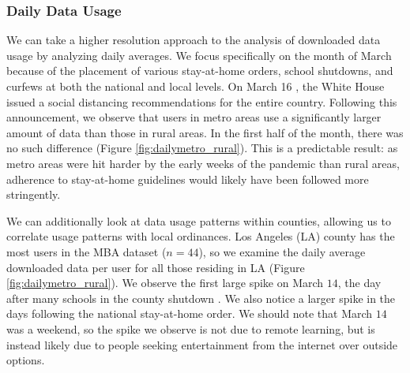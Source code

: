 \subsubsection{Daily Data Usage}
We can take a higher resolution approach to the analysis of downloaded data usage by analyzing daily averages. We focus specifically on the month of March because of the placement of various stay-at-home orders, school shutdowns, and curfews at both the national and local levels. On March 16 \cite{trump2020coronavirus}, the White House issued a social distancing recommendations for the entire country. Following this announcement, we observe that users in metro areas use a significantly larger amount of data than those in rural areas. In the first half of the month, there was no such difference (Figure \ref{fig:dailymetro_rural}). This is a predictable result: as metro areas were hit harder by the early weeks of the pandemic than rural areas, adherence to stay-at-home guidelines would likely have been followed more stringently. 

We can additionally look at data usage patterns within counties, allowing us to correlate usage patterns with local ordinances. Los Angeles (LA) county has the most users in the MBA dataset ($n=44$), so we examine the daily average downloaded data per user for all those residing in LA (Figure \ref{fig:dailymetro_rural}). We observe the first large spike on March $14$, the day after many schools in the county shutdown \cite{haire2020LA}. We also notice a larger spike in the days following the national stay-at-home order. We should note that March $14$ was a weekend, so the spike we observe is not due to remote learning, but is instead likely due to people seeking entertainment from the internet over outside options. 

